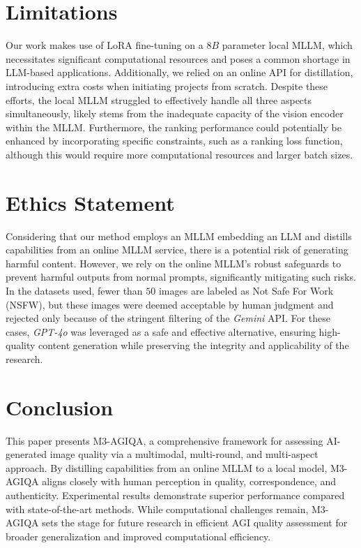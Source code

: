 
\section{Limitations} \label{sec:limit}
Our work makes use of LoRA fine-tuning on a $8B$ parameter local MLLM, which necessitates significant computational resources and poses a common shortage in LLM-based applications.
Additionally, we relied on an online API for distillation, introducing extra costs when initiating projects from scratch.
Despite these efforts, the local MLLM struggled to effectively handle all three aspects simultaneously, likely stems from the inadequate capacity of the vision encoder within the MLLM.
Furthermore, the ranking performance could potentially be enhanced by incorporating specific constraints, such as a ranking loss function, although this would require more computational resources and larger batch sizes.

\section{Ethics Statement} \label{sec:ethics}
Considering that our method employs an MLLM embedding an LLM and distills capabilities from an online MLLM service, there is a potential risk of generating harmful content.
However, we rely on the online MLLM's robust safeguards to prevent harmful outputs from normal prompts, significantly mitigating such risks.
In the datasets used, fewer than $50$ images are labeled as Not Safe For Work (NSFW), but these images were deemed acceptable by human judgment and rejected only because of the stringent filtering of the \textit{Gemini} API.
For these cases, \textit{GPT-4o} was leveraged as a safe and effective alternative, ensuring high-quality content generation while preserving the integrity and applicability of the research.

\section{Conclusion} \label{sec:conclusion}
This paper presents M3-AGIQA, a comprehensive framework for assessing AI-generated image quality via a multimodal, multi-round, and multi-aspect approach.
By distilling capabilities from an online MLLM to a local model, M3-AGIQA aligns closely with human perception in quality, correspondence, and authenticity.
Experimental results demonstrate superior performance compared with state-of-the-art methods.
While computational challenges remain, M3-AGIQA sets the stage for future research in efficient AGI quality assessment for broader generalization and improved computational efficiency.